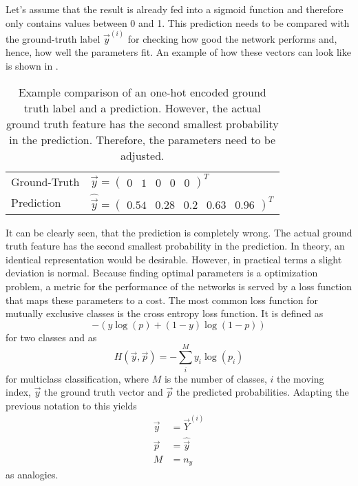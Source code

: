 Let's assume that the result is already fed into a sigmoid function and therefore only contains values between 0 and 1.
This prediction needs to be compared with the ground-truth label $\vec{y}^{(i)}$ for checking how good the network performs and, hence, how well the parameters fit.
An example of how these vectors can look like is shown in .
\begin{table}[]
	\centering
	\caption[Example Comparison of One-Hot Encoded Ground Truth Label and Prediction]{Example comparison of an one-hot encoded ground truth label and a prediction. However, the actual ground truth feature has the second smallest probability in the prediction. Therefore, the parameters need to be adjusted.}
	\label{tab:prediction}
	\begin{tabular}{ll}
		Ground-Truth & $\vec{y} = \begin{pmatrix} 0 & 1 & 0 & 0 & 0 \end{pmatrix}^T$                     \\
		Prediction   & $\hat{\vec{y}} = \begin{pmatrix} 0.54 & 0.28 & 0.2 & 0.63 & 0.96 \end{pmatrix}^T$
	\end{tabular}
\end{table}
It can be clearly seen, that the prediction is completely wrong.
The actual ground truth feature has the second smallest probability in the prediction.
In theory, an identical representation would be desirable.
However, in practical terms a slight deviation is normal.
Because finding optimal parameters is a optimization problem, a metric for the performance of the networks is served by a loss function that maps these parameters to a cost.
The most common loss function for mutually exclusive classes is the cross entropy loss function.
It is defined as
\begin{equation}
	-(y \log(p) + (1-y) \log(1-p))
\end{equation}
for two classes and as
\begin{equation}
	\label{eq:cross-entropy}
	H(\vec{y}, \vec{p}) = - \sum_{i}^{M} y_i \log (p_i)
\end{equation}
for multiclass classification, where $M$ is the number of classes, $i$ the moving index, $\vec{y}$ the ground truth vector and $\vec{p}$ the predicted probabilities.
Adapting the previous notation to this yields
\begin{align}
	\vec{y} &= \vec{Y}^{(i)} \\
	\vec{p} &= \hat{\vec{y}} \\
	M &= n_y
\end{align}
as analogies.
